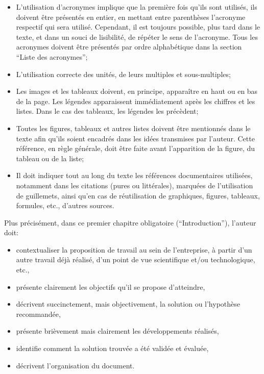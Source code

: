 \begin{itemize}
    \item L'utilisation d'acronymes implique que la première fois qu'ils sont utilisés, ils doivent être présentés en entier, en mettant entre parenthèses l'acronyme respectif qui sera utilisé. Cependant, il est toujours possible, plus tard dans le texte, et dans un souci de lisibilité, de répéter le sens de l'acronyme. Tous les acronymes doivent être présentés par ordre alphabétique dans la section ``Liste des acronymes'';
    \item L'utilisation correcte des unités, de leurs multiples et sous-multiples;
    \item Les images et les tableaux doivent, en principe, apparaître en haut ou en bas de la page. Les légendes apparaissent immédiatement après les chiffres et les listes. Dans le cas des tableaux, les légendes les précèdent;
    \item Toutes les figures, tableaux et autres listes doivent être mentionnés dans le texte afin qu'ils soient encadrés dans les idées transmises par l'auteur. Cette référence, en règle générale, doit être faite avant l'apparition de la figure, du tableau ou de la liste;
    \item Il doit indiquer tout au long du texte les références documentaires utilisées, notamment dans les citations (pures ou littérales), marquées de l'utilisation de guillemets, ainsi qu'en cas de réutilisation de graphiques, figures, tableaux, formules, etc., d’autres sources.
\end{itemize}

Plus précisément, dans ce premier chapitre obligatoire (``Introduction''), l'auteur doit:
\begin{itemize}
    \item contextualiser la proposition de travail au sein de l'entreprise, à partir d'un autre travail déjà réalisé, d'un point de vue scientifique et/ou technologique, etc.,
    \item présente clairement les objectifs qu'il se propose d'atteindre,
    \item décrivent succinctement, mais objectivement, la solution ou l'hypothèse recommandée,
    \item présente brièvement mais clairement les développements réalisés,
    \item identifie comment la solution trouvée a été validée et évaluée,
    \item décrivent l'organisation du document.
\end{itemize}

